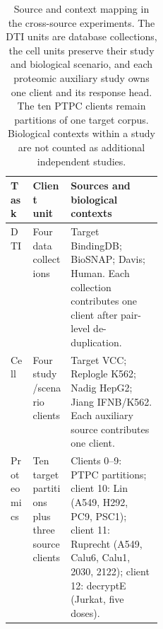 \begin{table}[htbp]
\caption{Source and context mapping in the cross-source experiments. The DTI units are database collections, the cell units preserve their study and biological scenario, and each proteomic auxiliary study owns one client and its response head. The ten PTPC clients remain partitions of one target corpus. Biological contexts within a study are not counted as additional independent studies.}
\label{tab:supplemental-source-clients}
\centering\small
\setlength{\tabcolsep}{4pt}
\begin{tabularx}{\linewidth}{@{}l>{\raggedright\arraybackslash}p{0.25\linewidth}X@{}}
\toprule
Task & Client unit & Sources and biological contexts \\
\midrule
DTI & Four data collections & Target BindingDB; BioSNAP; Davis; Human. Each collection contributes one client after pair-level de-duplication. \\
Cell & Four study/scenario clients & Target VCC; Replogle K562; Nadig HepG2; Jiang IFNB/K562. Each auxiliary source contributes one client. \\
Proteomics & Ten target partitions plus three source clients & Clients 0--9: PTPC partitions; client 10: Lin (A549, H292, PC9, PSC1); client 11: Ruprecht (A549, Calu6, Calu1, 2030, 2122); client 12: decryptE (Jurkat, five doses). \\
\bottomrule
\end{tabularx}
\end{table}
